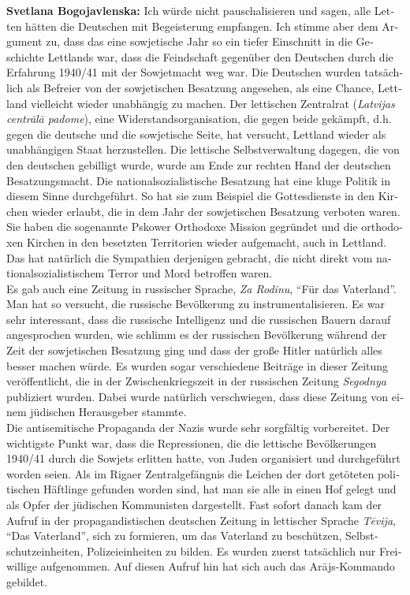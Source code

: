 \begin{otherlanguage}{ngerman}
\textbf{Svetlana Bogojavlenska:} Ich würde nicht pauschalisieren und sagen, alle Letten hätten die Deutschen mit Begeisterung empfangen. Ich stimme aber dem Argument zu, dass das eine sowjetische Jahr so ein tiefer Einschnitt in die Geschichte Lettlands war, dass die Feindschaft gegenüber den Deutschen durch die Erfahrung 1940/41 mit der Sowjetmacht weg war. Die Deutschen wurden tatsächlich als Befreier von der sowjetischen Besatzung angesehen, als eine Chance, Lettland vielleicht wieder unabhängig zu machen. Der lettischen Zentralrat (\textit{Latvijas centrālā padome}), eine Widerstandsorganisation, die gegen beide gekämpft, d.h. gegen die deutsche und die sowjetische Seite, hat versucht, Lettland wieder als unabhängigen Staat herzustellen. Die lettische Selbstverwaltung dagegen, die von den deutschen gebilligt wurde, wurde am Ende zur rechten Hand der deutschen Besatzungsmacht. Die nationalsozialistische Besatzung hat eine kluge Politik in diesem Sinne durchgeführt. So hat sie zum Beispiel die Gottesdienste in den Kirchen wieder erlaubt, die in dem Jahr der sowjetischen Besatzung verboten waren. Sie haben die sogenannte Pskower Orthodoxe Mission gegründet und die orthodoxen Kirchen in den besetzten Territorien wieder aufgemacht, auch in Lettland. Das hat natürlich die Sympathien derjenigen gebracht, die nicht direkt vom nationalsozialistischem Terror und Mord betroffen waren.\\
Es gab auch eine Zeitung in russischer Sprache, \textit{Za Rodinu}, "`Für das Vaterland"'. Man hat so versucht, die russische Bevölkerung zu instrumentalisieren. Es war sehr interessant, dass die russische Intelligenz und die russischen Bauern darauf angesprochen wurden, wie schlimm es der russischen Bevölkerung während der Zeit der sowjetischen Besatzung ging und dass der große Hitler natürlich alles besser machen würde. Es wurden sogar verschiedene Beiträge in dieser Zeitung veröffentlicht, die in der Zwischenkriegszeit in der russischen Zeitung \textit{Segodnya} publiziert wurden. Dabei wurde natürlich verschwiegen, dass diese Zeitung von einem jüdischen Herausgeber stammte.\\ 
Die antisemitische Propaganda der Nazis wurde sehr sorgfältig vorbereitet. Der wichtigste Punkt war, dass die Repressionen, die die lettische Bevölkerungen 1940/41 durch die Sowjets erlitten hatte, von Juden organisiert und durchgeführt worden seien. Als im Rigaer Zentralgefängnis die Leichen der dort getöteten politischen Häftlinge gefunden worden sind, hat man sie alle in einen Hof gelegt und als Opfer der jüdischen Kommunisten dargestellt. Fast sofort danach kam der Aufruf in der propagandistischen deutschen Zeitung in lettischer Sprache \textit{Tēvija}, "`Das Vaterland"', sich zu formieren, um das Vaterland zu beschützen, Selbstschutzeinheiten, Polizeieinheiten zu bilden. Es wurden zuerst tatsächlich nur Freiwillige aufgenommen. Auf diesen Aufruf hin hat sich auch das Arājs-Kommando gebildet.


\end{otherlanguage}
